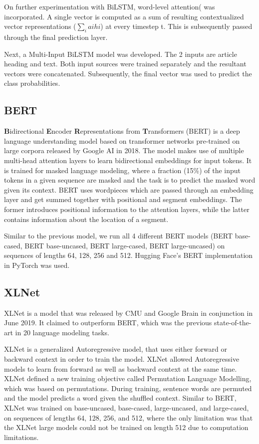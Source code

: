 \documentclass[11pt]{article}
\begin{document}
On further experimentation with BiLSTM, word-level attention( \cite{yang2016hierarchical} was incorporated. A single vector is computed as a sum of resulting contextualized vector representations ($\sum_{i}aihi $) at every timestep t. This is subsequently passed through the final prediction layer. 

Next, a Multi-Input BiLSTM model was developed. The 2 inputs are article heading and text. Both input sources were trained separately and the resultant vectors were concatenated. Subsequently, the final vector was used to predict the class probabilities.

\subsection{BERT}

\textbf{B}idirectional \textbf{E}ncoder \textbf{R}epresentations from \textbf{T}ransformers (BERT) is a deep language understanding model based on transformer networks \cite{vaswani2017attention} pre-trained on large corpora \cite{devlin2018bert} released by Google AI in 2018. The model makes use of multiple multi-head attention layers to learn bidirectional embeddings for input tokens. It is trained for masked language modeling, where a fraction (15\%) of the input tokens in a given sequence are masked and the task is to predict the masked word given its context. BERT uses wordpieces which are passed through an embedding layer and get summed together with positional and segment embeddings. The former introduces positional information to the attention layers, while the latter contains information about the location of a segment. 

Similar to the previous model, we run all 4 different BERT models (BERT base-cased, BERT base-uncased, BERT large-cased, BERT large-uncased) on sequences of lengths 64, 128, 256 and 512. Hugging Face’s BERT implementation \cite{wolf2019transformers} in PyTorch was used.

\subsection{XLNet}
XLNet \cite{yang2019xlnet} is a model that was released by CMU and Google Brain in conjunction in June 2019. It claimed to outperform BERT, which was the previous state-of-the-art in 20 language modeling tasks. 

XLNet is a generalized Autoregressive model, that uses either forward or backward context in order to train the model. XLNet allowed Autoregressive models to learn from forward as well as backward context at the same time. XLNet defined a new training objective called Permutation Language Modelling, which was based on permutations. During training, sentence words are permuted and the model predicts a word given the shuffled context. Similar to BERT, XLNet was trained on base-uncased, base-cased, large-uncased, and large-cased, on sequences of lengths 64, 128, 256, and 512, where the only limitation was that the XLNet large models could not be trained on length 512 due to computation limitations.
\end{document}
